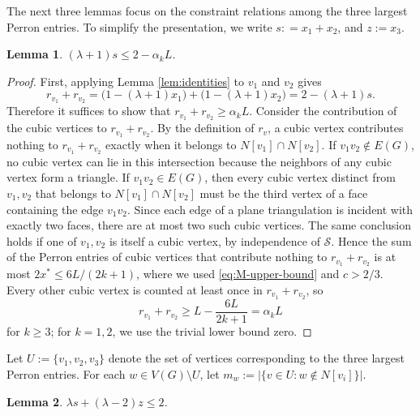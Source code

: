 \documentclass[11pt]{article}
\theoremstyle{plain}
\newtheorem{lemma}{Lemma}[section]
\theoremstyle{definition}
\numberwithin{equation}{section}
\begin{document}
The next three lemmas focus on the constraint relations among the three largest Perron entries. 
To simplify the presentation, we write $s: = x_1 + x_2$, and $z:= x_3$.

\begin{lemma}\label{lem:constraint}
$(\lambda + 1)s\leq 2 - \alpha_k L$.
\end{lemma}

\begin{proof}
First, applying Lemma \ref{lem:identities} to $v_1$ and $v_2$ gives
\[
r_{v_1} + r_{v_2} = \big(1 - (\lambda + 1) x_1\big) + \big(1 - (\lambda + 1) x_2\big) 
= 2 - (\lambda + 1) s.
\]
Therefore it suffices to show that $r_{v_1} + r_{v_2} \geq \alpha_k L$.
Consider the contribution of the cubic vertices to $r_{v_1} + r_{v_2}$.
By the definition of $r_v$, a cubic vertex contributes nothing to $r_{v_1}+r_{v_2}$ exactly when it belongs to
$N[v_1]\cap N[v_2]$. If $v_1v_2\notin E(G)$, no cubic vertex can lie in this
intersection because the neighbors of any cubic vertex form a triangle. If
$v_1v_2\in E(G)$, then every cubic vertex distinct from $v_1,v_2$
that belongs to $N[v_1]\cap N[v_2]$ must be the third vertex of a face containing 
the edge $v_1v_2$. Since each edge of a plane triangulation is incident with exactly 
two faces, there are at most two such cubic vertices. The same conclusion holds if one of
$v_1,v_2$ is itself a cubic vertex, by independence of $\mathcal{S}$. Hence the sum of 
the Perron entries of cubic vertices that contribute nothing to $r_{v_1} + r_{v_2}$ is 
at most $2x^*\leq 6L/(2k + 1)$, where we used \eqref{eq:M-upper-bound} and $c>2/3$. 
Every other cubic vertex is counted at least once in $r_{v_1} + r_{v_2}$, so
\[
r_{v_1} + r_{v_2}\geq L - \frac{6L}{2k+1} = \alpha_k L
\]
for $k\geq 3$; for $k=1,2$, we use the trivial lower bound zero.
\end{proof}

Let $U:=\{v_1,v_2,v_3\}$ denote the set of vertices corresponding to the three largest Perron entries.
For each \(w\in V(G)\setminus U\), let $m_w:= \big|\{v\in U: w\notin N[v_i]\}\big|$.

\begin{lemma}\label{lem:topthree}
$\lambda s + (\lambda - 2) z\leq 2$.
\end{lemma}
\end{document}
